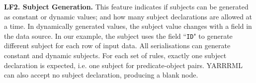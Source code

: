 \textbf{LF2. Subject Generation.} 
This feature indicates if subjects can be generated as constant or dynamic values; and how many subject declarations are allowed at a time. In dynamically generated values, the subject value changes with a field in the data source. In our example, the subject uses the field ``\texttt{ID}" to generate different subject for each row of input data. %
All serialisations can generate constant and dynamic subjects. For each set of rules, exactly one subject declaration is expected, i.e. one subject for predicate-object pairs. YARRRML can also accept no subject declaration, producing a blank node. %


